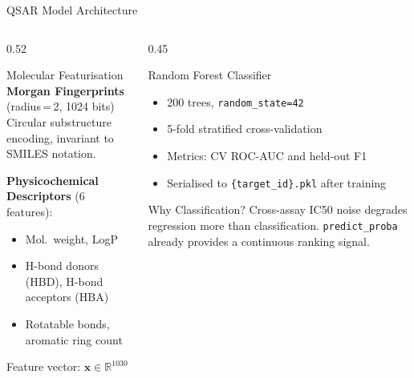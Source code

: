 \begin{frame}{QSAR Model Architecture}
  \begin{columns}[T]
    \begin{column}{0.52\textwidth}
      \begin{block}{Molecular Featurisation}
        \textbf{Morgan Fingerprints} (radius\,=\,2, 1024 bits)\\
        Circular substructure encoding, invariant to SMILES
        notation.

        \vspace{0.25cm}
        \textbf{Physicochemical Descriptors} (6 features):
        \begin{itemize}
          \item Mol.\ weight, LogP
          \item H-bond donors (HBD), H-bond acceptors (HBA)
          \item Rotatable bonds, aromatic ring count
        \end{itemize}

        \vspace{0.2cm}
        Feature vector: $\mathbf{x} \in \mathbb{R}^{1030}$
      \end{block}
    \end{column}
    \begin{column}{0.45\textwidth}
      \begin{block}{Random Forest Classifier}
        \begin{itemize}
          \item 200 trees, \texttt{random\_state=42}
          \item 5-fold stratified cross-validation
          \item Metrics: CV ROC-AUC and held-out F1
          \item Serialised to \texttt{\{target\_id\}.pkl} after training
        \end{itemize}
      \end{block}
      \vspace{0.25cm}
      \begin{alertblock}{Why Classification?}
        Cross-assay IC50 noise degrades regression more than
        classification. \texttt{predict\_proba} already
        provides a continuous ranking signal.
      \end{alertblock}
    \end{column}
  \end{columns}
\end{frame}

